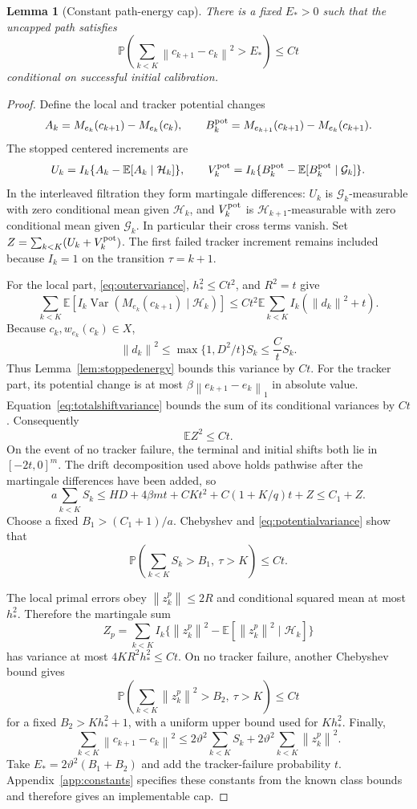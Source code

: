 \documentclass[11pt,a4paper]{article}
\newcommand{\E}{\mathbb E}
\newcommand{\Pp}{\mathbb P}
\newcommand{\norm}[1]{\left\lVert#1\right\rVert}
\DeclareMathOperator{\Var}{Var}
\newtheorem{lemma}[theorem]{Lemma}
\theoremstyle{remark}
\numberwithin{equation}{section}
\begin{document}
\begin{lemma}[Constant path-energy cap]\label{lem:energycap}
There is a fixed $E_*>0$ such that the uncapped path satisfies
\begin{equation}
 \Pp\left(\sum_{k<K}\norm{c_{k+1}-c_k}^2>E_*\right)\le Ct
 \label{eq:energytail}
\end{equation}
conditional on successful initial calibration.
\end{lemma}
\begin{proof}
Define the local and tracker potential changes
\[
 A_k=M_{e_k}(c_{k+1})-M_{e_k}(c_k),\qquad
 B_k^{\rm pot}=M_{e_{k+1}}(c_{k+1})-M_{e_k}(c_{k+1}).
\]
The stopped centered increments are
\[
 U_k=I_k\{A_k-\E[A_k\mid\mathcal H_k]\},\qquad
 V_k^{\rm pot}=I_k\{B_k^{\rm pot}-\E[B_k^{\rm pot}\mid\mathcal G_k]\}.
\]
In the interleaved filtration they form martingale differences: $U_k$ is $\mathcal G_k$-measurable with zero conditional mean given $\mathcal H_k$, and $V_k^{\rm pot}$ is $\mathcal H_{k+1}$-measurable with zero conditional mean given $\mathcal G_k$. In particular their cross terms vanish. Set $Z=\sum_{k<K}(U_k+V_k^{\rm pot})$. The first failed tracker increment remains included because $I_k=1$ on the transition $\tau=k+1$.

For the local part, \eqref{eq:outervariance}, $h_*^2\le Ct^2$, and $R^2=t$ give
\[
 \sum_{k<K}\E[I_k\Var(M_{e_k}(c_{k+1})\mid\mathcal H_k)]
 \le Ct^2\E\sum_{k<K}I_k(\norm{d_k}^2+t).
\]
Because $c_k,w_{e_k}(c_k)\in X$,
\[
 \norm{d_k}^2\le\max\{1,D^2/t\}S_k\le\frac{C}{t}S_k.
\]
Thus Lemma~\ref{lem:stoppedenergy} bounds this variance by $Ct$. For the tracker part, its potential change is at most $\beta\norm{e_{k+1}-e_k}_1$ in absolute value. Equation~\eqref{eq:totalshiftvariance} bounds the sum of its conditional variances by $Ct$. Consequently
\begin{equation}
 \E Z^2\le Ct.\label{eq:potentialvariance}
\end{equation}
On the event of no tracker failure, the terminal and initial shifts both lie in $[-2t,0]^m$. The drift decomposition used above holds pathwise after the martingale differences have been added, so
\[
 a\sum_{k<K}S_k\le HD+4\beta mt+CKt^2+C(1+K/q)t+Z\le C_1+Z.
\]
Choose a fixed $B_1>(C_1+1)/a$. Chebyshev and \eqref{eq:potentialvariance} show that
\[
 \Pp\left(\sum_{k<K}S_k>B_1,\ \tau>K\right)\le Ct.
\]

The local primal errors obey $\norm{z_k^p}\le2R$ and conditional squared mean at most $h_*^2$. Therefore the martingale sum
\[
 Z_p=\sum_{k<K}I_k\{\norm{z_k^p}^2-\E[\norm{z_k^p}^2\mid\mathcal H_k]\}
\]
has variance at most $4KR^2h_*^2\le Ct$. On no tracker failure, another Chebyshev bound gives
\[
 \Pp\left(\sum_{k<K}\norm{z_k^p}^2>B_2,\ \tau>K\right)\le Ct
\]
for a fixed $B_2>Kh_*^2+1$, with a uniform upper bound used for $Kh_*^2$. Finally,
\[
 \sum_{k<K}\norm{c_{k+1}-c_k}^2
 \le2\vartheta^2\sum_{k<K}S_k+2\vartheta^2\sum_{k<K}\norm{z_k^p}^2.
\]
Take $E_*=2\vartheta^2(B_1+B_2)$ and add the tracker-failure probability $t$. Appendix~\ref{app:constants} specifies these constants from the known class bounds and therefore gives an implementable cap.
\end{proof}
\end{document}
